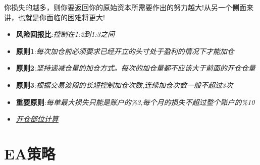 你损失的越多，则你要返回你的原始资本所需要作出的努力越大!从另一个侧面来讲，也就是你面临的困难将更大!

\begin{itemize}
\item \textbf{风险回报比}:\textit{控制在1:2到1:3之间}
\item \textbf{原则1}:\textit{每次加仓前必须要求已经开立的头寸处于盈利的情况下才能加仓}
\item \textbf{原则2}:\textit{坚持递减仓量的加仓方式。每次的加仓量都不应该大于前面的开仓仓量}
\item \textbf{原则3}:\textit{根据交易波段的长短控制加仓次数,连续加仓次数一般不超过3次}
\item \textbf{重要原则}:\textit{每单最大损失只能是账户的\%3,每个月的损失不超过整个账户的\%10}
\item \href{run:Risk Position Size Calculation.xlsx}{\textit{开仓部位计算}} 
\end{itemize}


\section{EA策略}
\begin{itemize}



\end{itemize}






